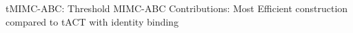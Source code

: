 tMIMC-ABC: Threshold MIMC-ABC
Contributions:
Most Efficient construction compared to tACT with identity binding

